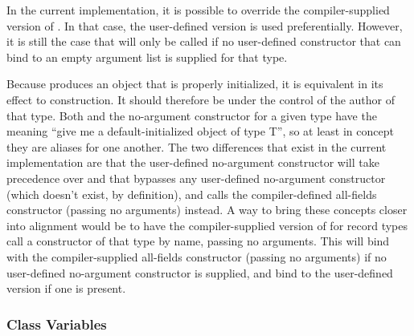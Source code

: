 In the current implementation, it is possible to override the compiler-supplied version of
.  In that case, the user-defined version is used preferentially.
However, it is still the case that  will only be called if no
user-defined constructor that can bind to an empty argument list is supplied for that
type.

Because  produces an object that is properly initialized, it is
equivalent in its effect to construction.  It should therefore be under the control of the
author of that type.  Both  and the no-argument constructor for a given
type have the meaning ``give me a default-initialized object of type T'', so at least in
concept they are aliases for one another.  The two differences that exist in the current
implementation are that the user-defined no-argument constructor will take precedence over
 and that  bypasses any user-defined no-argument
constructor (which doesn't exist, by definition), and calls the compiler-defined
all-fields constructor (passing no arguments) instead.  A way to bring these concepts
closer into alignment would be to have the compiler-supplied version of
 for record types call a constructor of that type by name, passing no
arguments.  This will bind with the compiler-supplied all-fields constructor (passing no
arguments) if no user-defined no-argument constructor is supplied, and bind to the
user-defined version if one is present.

\subsubsection{Class Variables}

